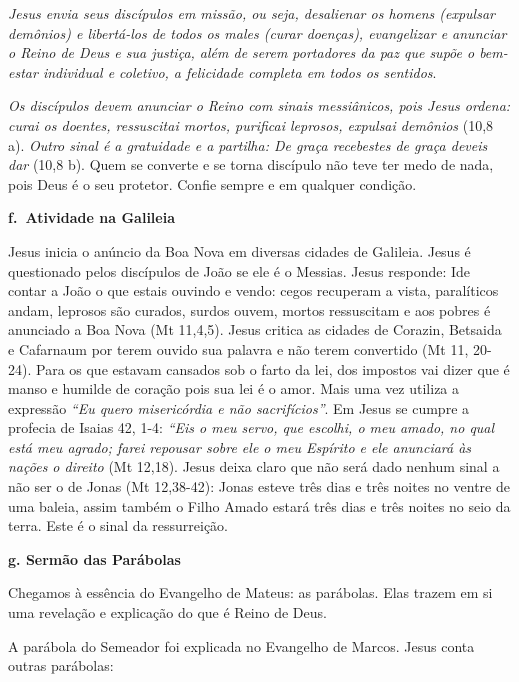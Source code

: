\documentclass[
]{book}
\begin{document}
\emph{Jesus envia seus discípulos em missão, ou seja, desalienar os homens (expulsar demônios) e libertá-los de todos os males (curar doenças), evangelizar e anunciar o Reino de Deus e sua justiça, além de serem portadores da paz que supõe o bem-estar individual e coletivo, a felicidade completa em todos os sentidos}.

\emph{Os discípulos devem anunciar o Reino com sinais messiânicos, pois Jesus ordena: curai os doentes, ressuscitai mortos, purificai leprosos, expulsai demônios} (10,8 a). \emph{Outro sinal é a gratuidade e a partilha: De graça recebestes de graça deveis dar} (10,8 b). Quem se converte e se torna discípulo não teve ter medo de nada, pois Deus é o seu protetor. Confie sempre e em qualquer condição.

\textbf{f.~Atividade na Galileia}

Jesus inicia o anúncio da Boa Nova em diversas cidades de Galileia. Jesus é questionado pelos discípulos de João se ele é o Messias. Jesus responde: Ide contar a João o que estais ouvindo e vendo: cegos recuperam a vista, paralíticos andam, leprosos são curados, surdos ouvem, mortos ressuscitam e aos pobres é anunciado a Boa Nova (Mt 11,4,5). Jesus critica as cidades de Corazin, Betsaida e Cafarnaum por terem ouvido sua palavra e não terem convertido (Mt 11, 20-24). Para os que estavam cansados sob o farto da lei, dos impostos vai dizer que é manso e humilde de coração pois sua lei é o amor. Mais uma vez utiliza a expressão \emph{``Eu quero misericórdia e não sacrifícios''}. Em Jesus se cumpre a profecia de Isaias 42, 1-4: \emph{``Eis o meu servo, que escolhi, o meu amado, no qual está meu agrado; farei repousar sobre ele o meu Espírito e ele anunciará às nações o direito} (Mt 12,18). Jesus deixa claro que não será dado nenhum sinal a não ser o de Jonas (Mt 12,38-42): Jonas esteve três dias e três noites no ventre de uma baleia, assim também o Filho Amado estará três dias e três noites no seio da terra. Este é o sinal da ressurreição.

\textbf{g. Sermão das Parábolas}

Chegamos à essência do Evangelho de Mateus: as parábolas. Elas trazem em si uma revelação e explicação do que é Reino de Deus.

A parábola do Semeador foi explicada no Evangelho de Marcos. Jesus conta outras parábolas:
\end{document}
